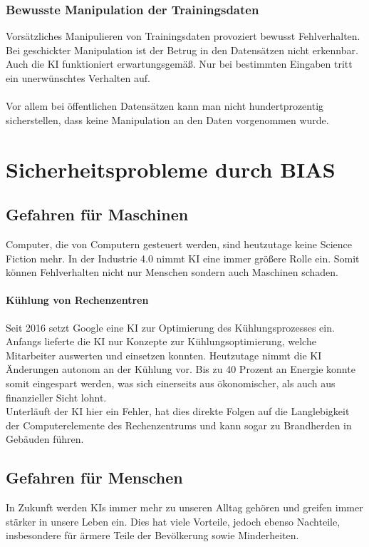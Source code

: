 \documentclass[12pt,oneside,a4paper,parskip]{scrbook}
\begin{document}
\subsection{Bewusste Manipulation der Trainingsdaten}
\label{section:manipulationInData}
Vorsätzliches Manipulieren von Trainingsdaten provoziert bewusst Fehlverhalten. Bei geschickter Manipulation ist der Betrug in den Datensätzen nicht erkennbar. Auch die KI funktioniert erwartungsgemäß. Nur bei bestimmten Eingaben tritt ein unerwünschtes Verhalten auf. \\\\
Vor allem bei öffentlichen Datensätzen kann man nicht hundertprozentig sicherstellen, dass keine Manipulation an den Daten vorgenommen wurde.
\chapter{Sicherheitsprobleme durch BIAS}
\section{Gefahren für Maschinen}
Computer, die von Computern gesteuert werden, sind heutzutage keine Science Fiction mehr. In der Industrie 4.0 nimmt KI eine immer größere Rolle ein. Somit können Fehlverhalten nicht nur Menschen sondern auch Maschinen schaden.
\subsubsection{Kühlung von Rechenzentren}
Seit 2016 setzt Google eine KI zur Optimierung des Kühlungsprozesses ein. Anfangs lieferte die KI nur Konzepte zur Kühlungsoptimierung, welche Mitarbeiter auswerten und einsetzen konnten. Heutzutage nimmt die KI Änderungen autonom an der Kühlung vor. Bis zu 40 Prozent an Energie konnte somit eingespart werden, was sich einerseits aus ökonomischer, als auch aus finanzieller Sicht lohnt.\\
Unterläuft der KI hier ein Fehler, hat dies direkte Folgen auf die Langlebigkeit der Computerelemente des Rechenzentrums und kann sogar zu Brandherden in Gebäuden führen.
\section{Gefahren für Menschen}
In Zukunft werden KIs immer mehr zu unseren Alltag gehören und greifen immer stärker in unsere Leben ein. Dies hat viele Vorteile, jedoch ebenso Nachteile, insbesondere für ärmere Teile der Bevölkerung sowie Minderheiten.
\end{document}
